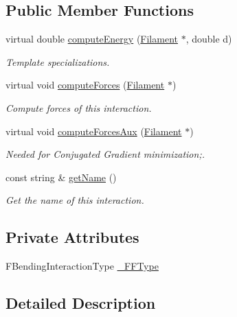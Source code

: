 \subsection*{Public Member Functions}
\begin{DoxyCompactItemize}
\item 
virtual double \hyperlink{classFilamentBending_ad182fa47da7a97e20fcd83e0737b4ea9}{compute\+Energy} (\hyperlink{classFilament}{Filament} $\ast$, double d)
\begin{DoxyCompactList}\small\item\em Template specializations. \end{DoxyCompactList}\item 
virtual void \hyperlink{classFilamentBending_a5e57f48720ca3137e684e1f1d3e3bdb9}{compute\+Forces} (\hyperlink{classFilament}{Filament} $\ast$)
\begin{DoxyCompactList}\small\item\em Compute forces of this interaction. \end{DoxyCompactList}\item 
virtual void \hyperlink{classFilamentBending_ab93dd7643bc4cd7545096ca6b96c2bc2}{compute\+Forces\+Aux} (\hyperlink{classFilament}{Filament} $\ast$)
\begin{DoxyCompactList}\small\item\em Needed for Conjugated Gradient minimization;. \end{DoxyCompactList}\item 
const string \& \hyperlink{classFilamentInteractions_af3c391f24ffbb7088de189cdb209d650}{get\+Name} ()
\begin{DoxyCompactList}\small\item\em Get the name of this interaction. \end{DoxyCompactList}\end{DoxyCompactItemize}
\subsection*{Private Attributes}
\begin{DoxyCompactItemize}
\item 
F\+Bending\+Interaction\+Type \hyperlink{classFilamentBending_a48702549ba5c7f9e511a770ec5e78886}{\+\_\+\+F\+F\+Type}
\end{DoxyCompactItemize}


\subsection{Detailed Description}
